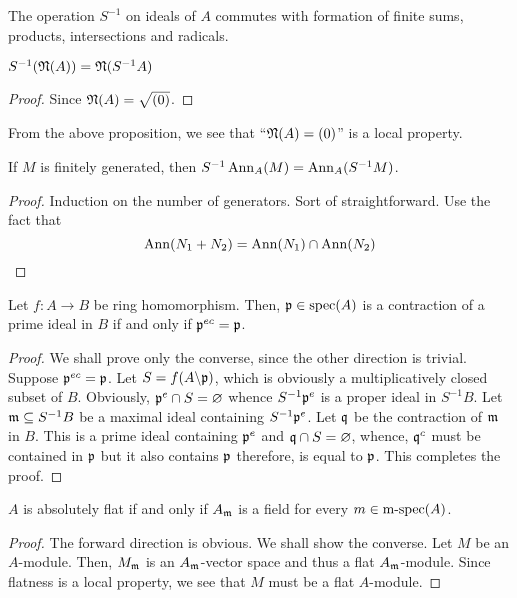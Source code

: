 \begin{proposition}
    The operation $S^{-1}$ on ideals of $A$ commutes with formation of finite sums, products, intersections and radicals.
\end{proposition}

\begin{corollary}
    $S^{-1}(\mathfrak N(A)) = \mathfrak N(S^{-1}A)$
\end{corollary}
\begin{proof}
    Since $\mathfrak N(A) = \sqrt{(0)}$.
\end{proof}

From the above proposition, we see that ``$\mathfrak N(A) = (0)$'' is a local property.

\begin{proposition}
    If $M$ is finitely generated, then $S^{-1}\operatorname{Ann}_A(M) = \operatorname{Ann}_A(S^{-1}M)$. 
\end{proposition}
\begin{proof}
    Induction on the number of generators. Sort of straightforward. Use the fact that 
    \begin{equation*}
        \operatorname{Ann}(N_1 + N_2) = \operatorname{Ann}(N_1)\cap\operatorname{Ann}(N_2)\qedhere
    \end{equation*}
\end{proof}

\begin{theorem}
    Let $f: A\to B$ be ring homomorphism. Then, $\mathfrak p\in\operatorname{spec}(A)$ is a contraction of a prime ideal in $B$ if and only if $\mathfrak p^{ec} = \mathfrak p$.
\end{theorem}
\begin{proof}
    We shall prove only the converse, since the other direction is trivial. Suppose $\mathfrak p^{ec} = \mathfrak p$. Let $S = f(A\backslash\mathfrak p)$, which is obviously a multiplicatively closed subset of $B$. Obviously, $\mathfrak p^e\cap S = \varnothing$ whence $S^{-1}\mathfrak p^e$ is a proper ideal in $S^{-1}B$. Let $\mathfrak m\subseteq S^{-1}B$ be a maximal ideal containing $S^{-1}\mathfrak p^e$. Let $\mathfrak q$ be the contraction of $\mathfrak m$ in $B$. This is a prime ideal containing $\mathfrak p^e$ and $\mathfrak q\cap S = \varnothing$, whence, $\mathfrak q^c$ must be contained in $\mathfrak p$ but it also contains $\mathfrak p$ therefore, is equal to $\mathfrak p$. This completes the proof.
\end{proof}

\hrulefill 

\begin{theorem}
    $A$ is absolutely flat if and only if $A_\mathfrak m$ is a field for every $m\in\operatorname{m-spec}(A)$.
\end{theorem}
\begin{proof}
    The forward direction is obvious. We shall show the converse. Let $M$ be an $A$-module. Then, $M_\mathfrak m$ is an $A_\mathfrak m$-vector space and thus a flat $A_\mathfrak m$-module. Since flatness is a local property, we see that $M$ must be a flat $A$-module.
\end{proof}

